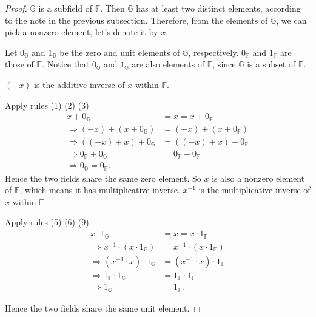 \begin{proof}
    $\mathbb{G}$ is a subfield of $\mathbb{F}$. Then $\mathbb{G}$ has at least two distinct elements, according to the note in the previous subsection. Therefore, from the elements of $\mathbb{G}$, we can pick a nonzero element, let's denote it by $x$.

    Let $0_{\mathbb{G}}$ and $1_{\mathbb{G}}$ be the zero and unit elements of $\mathbb{G}$, respectively. $0_{\mathbb{F}}$ and $1_{\mathbb{F}}$ are those of $\mathbb{F}$. Notice that $0_{\mathbb{G}}$ and $1_{\mathbb{G}}$ are also elements of $\mathbb{F}$, since $\mathbb{G}$ is a subset of $\mathbb{F}$.

    $(-x)$ is the additive inverse of $x$ within $\mathbb{F}$.

    Apply rules (1) (2) (3)
    \begin{align*}
        x + 0_{\mathbb{G}} & = x = x + 0_{\mathbb{F}} \\
        \Rightarrow (-x) + (x + 0_{\mathbb{G}}) & = (-x) + (x + 0_{\mathbb{F}}) \\
        \Rightarrow ((-x) + x) + 0_{\mathbb{G}} & = ((-x) + x) + 0_{\mathbb{F}} \\
        \Rightarrow 0_{\mathbb{F}} + 0_{\mathbb{G}} & = 0_{\mathbb{F}} + 0_{\mathbb{F}} \\
        \Rightarrow 0_{\mathbb{G}} = 0_{\mathbb{F}}.
    \end{align*}
    Hence the two fields share the same zero element. So $x$ is also a nonzero element of $\mathbb{F}$, which means it has multiplicative inverse. $x^{-1}$ is the multiplicative inverse of $x$ within $\mathbb{F}$.

    Apply rules (5) (6) (9)
    \begin{align*}
        x\cdot 1_{\mathbb{G}} & = x = x\cdot 1_{\mathbb{F}} \\
        \Rightarrow x^{-1}\cdot (x\cdot 1_{\mathbb{G}}) & = x^{-1}\cdot (x\cdot 1_{\mathbb{F}}) \\
        \Rightarrow (x^{-1}\cdot x)\cdot 1_{\mathbb{G}} & = (x^{-1}\cdot x)\cdot 1_{\mathbb{F}} \\
        \Rightarrow 1_{\mathbb{F}}\cdot 1_{\mathbb{G}} & = 1_{\mathbb{F}}\cdot 1_{\mathbb{F}} \\
        \Rightarrow 1_{\mathbb{G}} & = 1_{\mathbb{F}}.
    \end{align*}

    Hence the two fields share the same unit element.
\end{proof}

